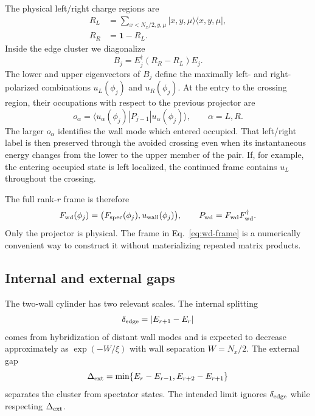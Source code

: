 \documentclass[aps,prb,twocolumn,floatfix,nofootinbib,superscriptaddress]{revtex4-2}
\newcommand{\ketbra}[2]{\lvert #1\rangle\langle #2\rvert}
\begin{document}
The physical left/right charge regions are
\begin{align}
 R_L&=\sum_{x<N_x/2,y,\mu}\ketbra{x,y,\mu}{x,y,\mu},\nonumber\\
 R_R&=\mathbf{1}-R_L .
 \label{eq:regions}
\end{align}
Inside the edge cluster we diagonalize
\begin{equation}
 B_j=E_j^\dagger(R_R-R_L)E_j .
 \label{eq:wall-polarization}
\end{equation}
The lower and upper eigenvectors of $B_j$ define the maximally left- and
right-polarized combinations $u_L(\phi_j)$ and $u_R(\phi_j)$.  At the entry
to the crossing region, their occupations with respect to the previous
projector are
\begin{equation}
 o_\alpha
 =\langle u_\alpha(\phi_j)|P_{j-1}|u_\alpha(\phi_j)\rangle,
 \qquad \alpha=L,R.
 \label{eq:entering-label}
\end{equation}
The larger $o_\alpha$ identifies the wall mode which entered occupied.  That
left/right label is then preserved through the avoided crossing even when
its instantaneous energy changes from the lower to the upper member of the
pair.  If, for example, the entering occupied state is left localized, the
continued frame contains $u_L$ throughout the crossing.

The full rank-$r$ frame is therefore
\begin{equation}
 F_{\rm wd}(\phi_j)
 =\big(F_{\rm spec}(\phi_j),u_{\rm wall}(\phi_j)\big),
 \qquad
 P_{\rm wd}=F_{\rm wd}F_{\rm wd}^\dagger .
 \label{eq:wd-frame}
\end{equation}
Only the projector is physical.  The frame in Eq.~\eqref{eq:wd-frame} is a
numerically convenient way to construct it without materializing repeated
matrix products.

\subsection{Internal and external gaps}

The two-wall cylinder has two relevant scales.  The internal splitting
\begin{equation}
 \delta_{\rm edge}=|E_{r+1}-E_r|
 \label{eq:internal-gap}
\end{equation}
comes from hybridization of distant wall modes and is expected to decrease
approximately as $\exp(-W/\xi)$ with wall separation $W=N_x/2$.  The
external gap
\begin{equation}
 \Delta_{\rm ext}
 =\min\{E_r-E_{r-1},E_{r+2}-E_{r+1}\}
 \label{eq:external-gap}
\end{equation}
separates the cluster from spectator states.  The intended limit ignores
$\delta_{\rm edge}$ while respecting $\Delta_{\rm ext}$.
\end{document}
